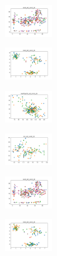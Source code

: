 \begin{figure}[H]
\begin{subfigure}
        \centering
        \includegraphics[width=0.234\textwidth]{img/hs/ecoli_set_const_20_589741062_clust.png}
    \end{subfigure}
    \hfill
    \begin{subfigure}
        \centering
        \includegraphics[width=0.234\textwidth]{img/hs/rand_set_const_20_589741062_clust.png}
    \end{subfigure}
    \hfill
    \begin{subfigure}
        \centering
        \includegraphics[width=0.234\textwidth]{img/hs/newthyroid_set_const_20_589741062_clust.png}
    \end{subfigure}
    \hfill
    \begin{subfigure}
        \centering
        \includegraphics[width=0.234\textwidth]{img/hs/iris_set_const_20_277451237_clust.png}
    \end{subfigure}
    \hfill
    \begin{subfigure}
        \centering
        \includegraphics[width=0.234\textwidth]{img/hs/ecoli_set_const_20_277451237_clust.png}
    \end{subfigure}
    \hfill
    \begin{subfigure}
        \centering
        \includegraphics[width=0.234\textwidth]{img/hs/rand_set_const_20_277451237_clust.png}

\end{subfigure}
\end{figure}
